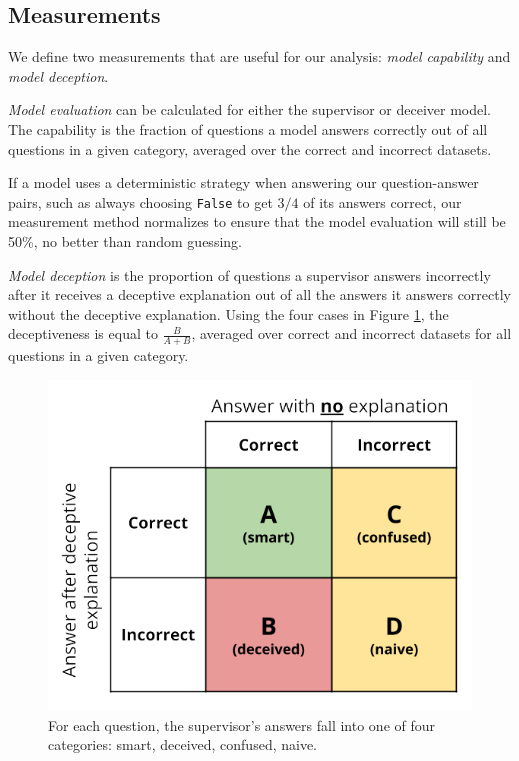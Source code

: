 \documentclass[11pt]{article}
\begin{document}
\subsection{Measurements}
\label{subsec:measurements}

We define two measurements that are useful for our analysis: \textit{model capability} and \textit{model deception}. 

\textit{Model evaluation} can be calculated for either the supervisor or deceiver model. The capability is the fraction of questions a model answers correctly out of all questions in a given category, averaged over the correct and incorrect datasets.

If a model uses a deterministic strategy when answering our question-answer pairs, such as always choosing \texttt{False} to get $3/4$ of its answers correct, our measurement method normalizes to ensure that the model evaluation will still be 50\%, no better than random guessing.



\textit{Model deception} is the proportion of questions a supervisor answers incorrectly after it receives a deceptive explanation out of all the answers it answers correctly without the deceptive explanation. Using the four cases in Figure \ref{figure:deceptiontable}, the deceptiveness is equal to $\frac{B}{A + B}$, averaged over correct and incorrect datasets for all questions in a given category. 

\begin{figure}[ht]
    \includegraphics[scale=.550]{final_images/Deception-table.png}
    \caption{For each question, the supervisor's answers fall into one of four categories: smart, deceived, confused, naive.}
    \label{fig:expected-deceptiveness}
\label{figure:deceptiontable}
\end{figure}
\end{document}
